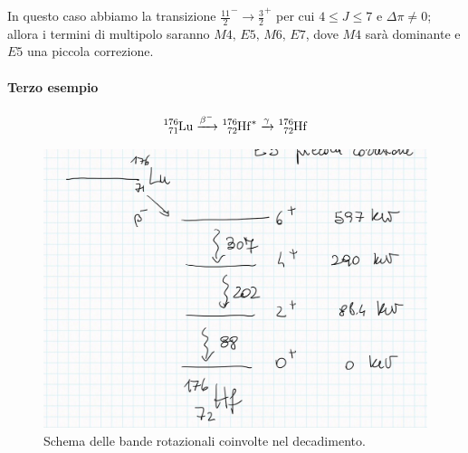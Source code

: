 In questo caso abbiamo la transizione $\frac{11}{2}^-\to\frac{3}{2}^+$ per cui $4\leq J \leq 7$ e $\Delta\pi \not = 0$; allora i termini di multipolo saranno $M4,\,E5,\,M6,\,E7$, dove $M4$ sarà dominante e $E5$ una piccola correzione.


\paragraph{Terzo esempio}
$$\ce{^{176}_{71}Lu}  \xrightarrow{\beta^-} \ce{^{176}_{72}Hf}^*  \xrightarrow{\gamma}  \ce{^{176}_{72}Hf}$$

\begin{figure}[h]
    \centering
    \includegraphics[scale=0.2]{Immagini/0310_bande3.png}
    \caption{Schema delle bande rotazionali coinvolte nel decadimento.}
    \label{0310_bande2}
\end{figure}

